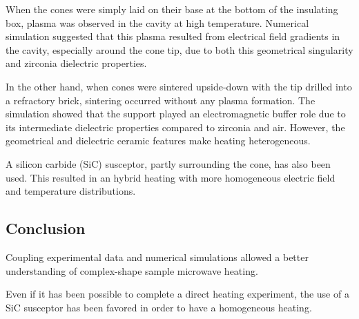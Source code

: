 \documentclass[11pt,a4paper,twocolumn]{article}
\begin{document}
When the cones were simply laid on their base at the bottom of the insulating box, plasma was observed in the cavity at high temperature. Numerical simulation suggested that this plasma resulted from electrical field gradients in the cavity, especially around the cone tip, due to both this geometrical singularity and zirconia dielectric properties.

In the other hand, when cones were sintered upside-down with the tip drilled into a refractory brick, sintering occurred without any plasma formation. The simulation showed that the support played an electromagnetic buffer role due to its intermediate dielectric properties compared to zirconia and air. However, the geometrical and dielectric ceramic features make heating heterogeneous.

A silicon carbide (SiC) susceptor, partly surrounding the cone, has also been used. This resulted in an hybrid heating with more homogeneous electric field and temperature distributions.

\begin{center}
\item \section*{Conclusion}
\end{center}

Coupling experimental data and numerical simulations allowed a better understanding of complex-shape sample microwave heating. 

Even if it has been possible to complete a direct heating experiment, the use of a SiC susceptor has been favored in order to have a homogeneous heating.
	
\end{document}
